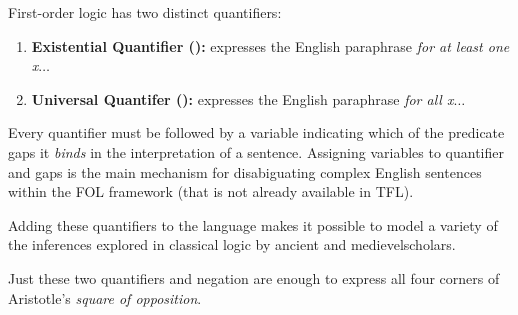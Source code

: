 \begin{definition}
  \label{def:fol-quantifiers-informal}
  First-order logic has two distinct quantifiers:
  \begin{enumerate}
  \item \textbf{Existential Quantifier (\eexists):} expresses the English
    paraphrase \emph{for at least one x}$\dots$
  \item \textbf{Universal Quantifer (\eforall):} expresses the English
    paraphrase \emph{for all x}$\dots$
  \end{enumerate}
  Every quantifier must be followed by a variable indicating which of the
  predicate gaps it \emph{binds} in the interpretation of a sentence. Assigning
  variables to quantifier and gaps is the main mechanism for disabiguating
  complex English sentences within the FOL framework (that is not already
  available in TFL).
\end{definition}

Adding these quantifiers to the language makes it possible to model a variety
of the inferences explored in classical logic by ancient and medievelscholars.

\begin{definition}
  Just these two quantifiers and negation are enough to express all four corners
  of Aristotle's \emph{square of opposition}. \\ \\
\end{definition}

